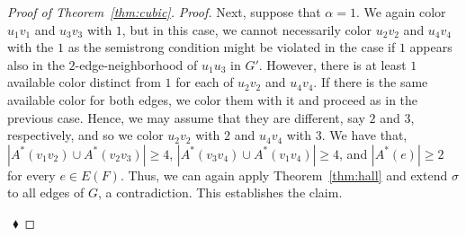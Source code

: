 \documentclass[12pt,a4paper]{article}
\newcommand{\set}[1]{\ensuremath{\left\{#1 \right\}}}
\newenvironment{proofclaim}[1][]%
    {\noindent \emph{Proof.} {}{#1}{}}{$~$\hfill $~\blacklozenge$ \vspace{0.2cm}}
\begin{document}
\begin{proof}[Proof of Theorem~\ref{thm:cubic}]
\begin{proofclaim}
		Next, suppose that $\alpha = 1$.
		We again color $u_1v_1$ and $u_3v_3$ with $1$,
		but in this case, we cannot necessarily color $u_2v_2$ and $u_4v_4$ with the $1$ as the semistrong condition might be violated
		in the case if $1$ appears also in the $2$-edge-neighborhood of $u_1u_3$ in $G'$.
		However, there is at least $1$ available color distinct from $1$ for each of $u_2v_2$ and $u_4v_4$. 
		If there is the same available color for both edges, we color them with it and proceed as in the previous case.
		Hence, we may assume that they are different, say $2$ and $3$, respectively, and so we color $u_2v_2$ with $2$
		and $u_4v_4$ with $3$.		
		We have that, $|A^*(v_1v_2) \cup A^*(v_2v_3)| \ge 4$, 
		$|A^*(v_3v_4) \cup A^*(v_1v_4)| \ge 4$, 
		and $|A^*(e)| \ge 2$ for every $e \in E(F)$. 
		Thus, we can again apply Theorem~\ref{thm:hall} and extend $\sigma$ to all edges of $G$, a contradiction.
		This establishes the claim.
		
%		
%		
	\end{proofclaim}				
	

\end{proof}
\end{document}
